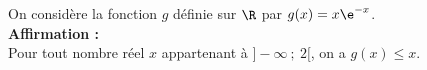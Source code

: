 On considère la fonction $g$ définie sur $\R$ par $g(x) = x\e^{-x}$.\\
\textbf{Affirmation  :}\\	
	Pour tout nombre réel $x$ appartenant à $] - \infty~;~2[$, on a $g(x) \leqslant x$.